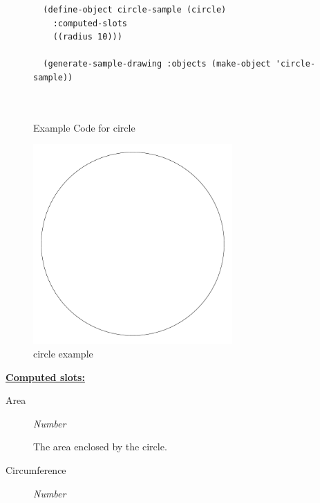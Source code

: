 \documentclass [11pt]{book}
\begin{document}
\begin{itemize}
\begin{figure}
\begin{lrbox}{\boxedverb}
\begin{minipage}{\linewidth}
{\begin{verbatim}
  (define-object circle-sample (circle)
    :computed-slots
    ((radius 10)))

  (generate-sample-drawing :objects (make-object 'circle-sample))

                  

\end{verbatim}}
\end{minipage}
\end{lrbox}
\fbox{\usebox{\boxedverb}}

\caption{Example Code for circle}

\label{fig:example-code-circle}

\end{figure}

\begin{figure}
\begin{center}
\includegraphics[width=3in,height=3in]{../images/example-circle.pdf}
\end{center}

\caption{circle example}

\label{fig:circle}

\end{figure}





\textbf{
\underline{Computed slots:}}

\begin{description}

\item [Area]
\emph{Number}

 The area enclosed by the circle.




\item [Circumference]
\emph{Number}


\end{description}
\end{itemize}
\end{document}
